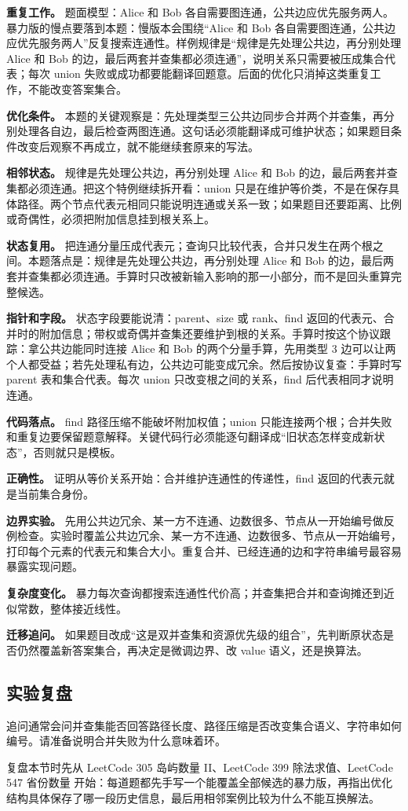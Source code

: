 \textbf{重复工作。} 题面模型：Alice 和 Bob 各自需要图连通，公共边应优先服务两人。暴力版的慢点要落到本题：慢版本会围绕“Alice 和 Bob 各自需要图连通，公共边应优先服务两人”反复搜索连通性。样例规律是“规律是先处理公共边，再分别处理 Alice 和 Bob 的边，最后两套并查集都必须连通”，说明关系只需要被压成集合代表；每次 union 失败或成功都要能翻译回题意。后面的优化只消掉这类重复工作，不能改变答案集合。

\textbf{优化条件。} 本题的关键观察是：先处理类型三公共边同步合并两个并查集，再分别处理各自边，最后检查两图连通。这句话必须能翻译成可维护状态；如果题目条件改变后观察不再成立，就不能继续套原来的写法。

\textbf{相邻状态。} 规律是先处理公共边，再分别处理 Alice 和 Bob 的边，最后两套并查集都必须连通。把这个特例继续拆开看：union 只是在维护等价类，不是在保存具体路径。两个节点代表元相同只能说明连通或关系一致；如果题目还要距离、比例或奇偶性，必须把附加信息挂到根关系上。

\textbf{状态复用。} 把连通分量压成代表元；查询只比较代表，合并只发生在两个根之间。本题落点是：规律是先处理公共边，再分别处理 Alice 和 Bob 的边，最后两套并查集都必须连通。手算时只改被新输入影响的那一小部分，而不是回头重算完整候选。

\textbf{指针和字段。} 状态字段要能说清：parent、size 或 rank、find 返回的代表元、合并时的附加信息；带权或奇偶并查集还要维护到根的关系。手算时按这个协议跟踪：拿公共边能同时连接 Alice 和 Bob 的两个分量手算，先用类型 3 边可以让两个人都受益；若先处理私有边，公共边可能变成冗余。然后按协议复查：手算时写 parent 表和集合代表。每次 union 只改变根之间的关系，find 后代表相同才说明连通。

\textbf{代码落点。} find 路径压缩不能破坏附加权值；union 只能连接两个根；合并失败和重复边要保留题意解释。关键代码行必须能逐句翻译成“旧状态怎样变成新状态”，否则就只是模板。

\textbf{正确性。} 证明从等价关系开始：合并维护连通性的传递性，find 返回的代表元就是当前集合身份。

\textbf{边界实验。} 先用公共边冗余、某一方不连通、边数很多、节点从一开始编号做反例检查。实验时覆盖公共边冗余、某一方不连通、边数很多、节点从一开始编号，打印每个元素的代表元和集合大小。重复合并、已经连通的边和字符串编号最容易暴露实现问题。

\textbf{复杂度变化。} 暴力每次查询都搜索连通性代价高；并查集把合并和查询摊还到近似常数，整体接近线性。

\textbf{迁移追问。} 如果题目改成“这是双并查集和资源优先级的组合”，先判断原状态是否仍然覆盖新答案集合，再决定是微调边界、改 value 语义，还是换算法。

\subsection{实验复盘}

追问通常会问并查集能否回答路径长度、路径压缩是否改变集合语义、字符串如何编号。请准备说明合并失败为什么意味着环。

复盘本节时先从 LeetCode 305 岛屿数量 II、LeetCode 399 除法求值、LeetCode 547 省份数量 开始：每道题都先手写一个能覆盖全部候选的暴力版，再指出优化结构具体保存了哪一段历史信息，最后用相邻案例比较为什么不能互换解法。
